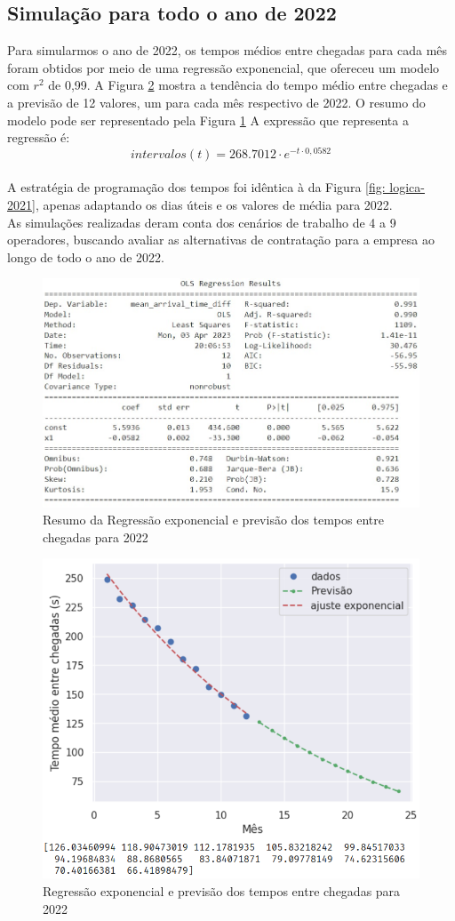 \subsection{Simulação para todo o ano de 2022}
\label{section: sim-2022}
Para simularmos o ano de 2022, os tempos médios entre chegadas para cada mês foram obtidos por meio de uma regressão exponencial, que ofereceu um modelo com $r^2$ de 0,99. A Figura \ref*{fig: regressao-expo-2022} mostra a tendência do tempo médio entre chegadas e a previsão de 12 valores, um para cada mês respectivo de 2022. O resumo do modelo pode ser representado pela Figura \ref*{fig: resumo-expo-2022} A expressão que representa a regressão é: $$intervalos(t) = 268.7012 \cdot e^{-t \cdot 0,0582}$$\\
A estratégia de programação dos tempos foi idêntica à da Figura \ref*{fig: logica-2021}, apenas adaptando os dias úteis e os valores de média para 2022.\\
As simulações realizadas deram conta dos cenários de trabalho de 4 a 9 operadores, buscando avaliar as alternativas de contratação para a empresa ao longo de todo o ano de 2022.

\begin{figure}[H]
    \centering
    \includegraphics[scale=0.9]{simulacao/resumo_OLS_previsao2022.jpg}
    \caption{Resumo da Regressão exponencial e previsão dos tempos entre chegadas para 2022}
    \label{fig: resumo-expo-2022}
\end{figure}


\begin{figure}[H]
    \centering
    \includegraphics[scale=1]{simulacao/regressao-expo-2022.png}
    \caption{Regressão exponencial e previsão dos tempos entre chegadas para 2022}
    \label{fig: regressao-expo-2022}
\end{figure}
